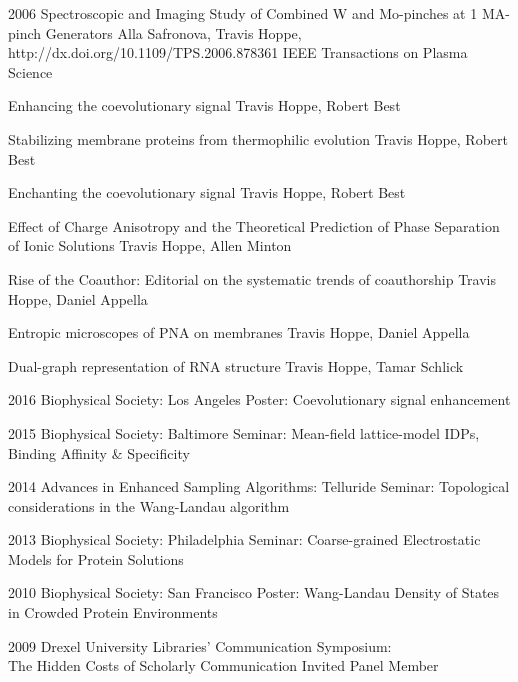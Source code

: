 \documentclass[]{scrartcl}
\begin{document}
\begin{cleanCV}
\Paper
{2006}
{Spectroscopic and Imaging Study of Combined W and Mo-pinches 
  at 1 MA-pinch Generators}
{Alla Safronova, Travis Hoppe, \etal}
{http://dx.doi.org/10.1109/TPS.2006.878361}
{IEEE Transactions on Plasma Science}



\PaperX
{Enhancing the coevolutionary signal}
{Travis Hoppe, Robert Best}

\PaperX
{Stabilizing membrane proteins from thermophilic evolution}
{Travis Hoppe, Robert Best}

\PaperX
{Enchanting the coevolutionary signal}
{Travis Hoppe, Robert Best}

\PaperX
{Effect of Charge Anisotropy and the Theoretical Prediction of Phase Separation of Ionic Solutions}
{Travis Hoppe, Allen Minton}

\PaperX
{Rise of the Coauthor: Editorial on the systematic trends of coauthorship}
{Travis Hoppe, Daniel Appella}

\PaperX
{Entropic microscopes of PNA on membranes}
{Travis Hoppe, Daniel Appella}

\PaperX
{Dual-graph representation of RNA structure}
{Travis Hoppe, Tamar Schlick}




\WorkExperienceX
{2016}
{Biophysical Society: Los Angeles}
{Poster: Coevolutionary signal enhancement}

\WorkExperienceX
{2015}
{Biophysical Society: Baltimore}
{Seminar: Mean-field lattice-model IDPs, Binding Affinity \& Specificity}

\WorkExperienceX
{2014}
{Advances in Enhanced Sampling Algorithms: Telluride}
{Seminar: Topological considerations in the Wang-Landau algorithm}

\WorkExperienceX
{2013}
{Biophysical Society: Philadelphia}
{Seminar: Coarse-grained Electrostatic Models for Protein Solutions}

\WorkExperienceX
{2010}
{Biophysical Society: San Francisco}
{Poster: Wang-Landau Density of States in Crowded Protein Environments}

\WorkExperienceX
{2009}
{Drexel University Libraries' Communication Symposium:\\The Hidden Costs of Scholarly Communication}
{Invited Panel Member}


\end{cleanCV}
\end{document}
